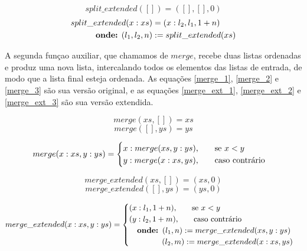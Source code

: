 \documentclass[12pt, oneside, a4paper,english,brazil]{abntex2}
\begin{document}
\newpage

\begin{equation}\label{split_ext_base}
  split\_extended([]) = ([], [], 0)
\end{equation}
\begin{equation}\label{split_ext_ind}
\begin{split}
  split\_extended(x : xs) &= (x : l_{2}, l_{1}, 1 + n)\\
  \text{\textbf{onde:} } (l_{1}, l_{2}, n) &:= split\_extended(xs)
\end{split}
\end{equation}


\qquad A segunda fun\c{c}ao auxiliar, que chamamos de $merge$, recebe duas listas
ordenadas e produz uma nova lista, intercalando todos os elementos das listas
de entrada, de modo que a lista final esteja ordenada. As equa\c{c}\~oes \ref{merge_1},
\ref{merge_2} e \ref{merge_3} s\~ao sua vers\~ao original, e as equa\c{c}\~oes
\ref{merge_ext_1}, \ref{merge_ext_2} e \ref{merge_ext_3} s\~ao sua vers\~ao extendida.

\begin{equation} \label{merge_1}
merge(xs, []) = xs
\end{equation}
\begin{equation} \label{merge_2}
merge([], ys) = ys
\end{equation}

\begin{equation} \label{merge_3}
merge(x : xs, y : ys) =
     \begin{cases}
       x : merge(xs, y : ys) \text{,\qquad se $x < y$} \\
       y : merge(x : xs, ys) \text{,\qquad caso contr\'ario}
     \end{cases}
\end{equation}

\begin{equation} \label{merge_ext_1}
merge\_extended(xs, []) = (xs, 0)
\end{equation}
\begin{equation} \label{merge_ext_2}
merge\_extended([], ys) = (ys, 0)
\end{equation}

\begin{equation} \label{merge_ext_3}
merge\_extended(x : xs, y : ys) =
     \begin{cases}
       (x : l_{1}, 1 + n) \text{,\qquad se $x < y$} \\
       (y : l_{2}, 1 + m) \text{,\qquad caso contr\'ario} \\
       \text{\quad \textbf{onde: }} (l_{1}, n) := merge\_extended(xs, y : ys) \\
       \text{\qquad \quad \,\,\,\,\, } (l_{2}, m) := merge\_extended(x : xs, ys)
     \end{cases}
\end{equation}
\end{document}
